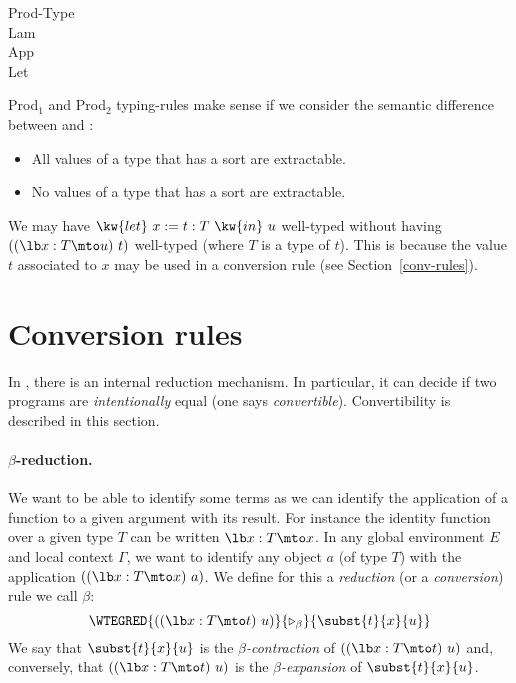 \begin{description}
\item[Prod-Type]  
\item[Lam] 
\item[App]
\item[Let] 
\end{description}

\Rem Prod$_1$ and Prod$_2$ typing-rules make sense if we consider the semantic
difference between {\Prop} and {\Set}:
\begin{itemize}
  \item All values of a type that has a sort {\Set} are extractable.
  \item No values of a type that has a sort {\Prop} are extractable.
\end{itemize}

\Rem We may have $\kw{let}~x:=t:T~\kw{in}~u$
well-typed without having $((\lb x:T\mto u)~t)$ well-typed (where
$T$ is a type of $t$). This is because the value $t$ associated to $x$
may be used in a conversion rule (see Section~\ref{conv-rules}).

\section[Conversion rules]{Conversion rules
\label{conv-rules}}

In \CIC, there is an internal reduction mechanism. In particular, it
can decide if two programs are {\em intentionally} equal (one
says {\em convertible}). Convertibility is described in this section.

\paragraph[$\beta$-reduction.]{$\beta$-reduction.\label{beta}}

We want to be able to identify some terms as we can identify the
application of a function to a given argument with its result. For
instance the identity function over a given type $T$ can be written
$\lb x:T\mto x$. In any global environment $E$ and local context $\Gamma$, we want to identify any object $a$ (of type $T$) with the
application $((\lb x:T\mto x)~a)$. We define for this a {\em reduction} (or a
{\em conversion}) rule we call $\beta$:
\[ \WTEGRED{((\lb x:T\mto
  t)~u)}{\triangleright_{\beta}}{\subst{t}{x}{u}} \] 
We say that $\subst{t}{x}{u}$ is the {\em $\beta$-contraction} of
$((\lb x:T\mto t)~u)$ and, conversely, that $((\lb x:T\mto t)~u)$
is the {\em $\beta$-expansion} of $\subst{t}{x}{u}$.

